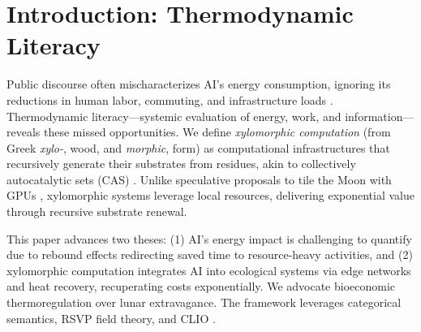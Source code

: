 \documentclass[11pt,a4paper]{article}
\theoremstyle{plain}
\theoremstyle{definition}
\theoremstyle{remark}
\begin{document}
\begin{abstract}
Across all four domains the same structural pattern obtains. A system boundary
is drawn too narrowly, a byproduct is classified as waste, and a relocation is
proposed to eliminate it. In thermodynamics, heat is externalized. In cognition,
prior formation is externalized. In epistemic systems, the evidence channel is
endogenized. In infrastructure, constraint environments are reconfigured. In each
case, the consequence is systematic misalignment between description and
operation, because the relevant structure has been placed outside the frame.

Policy mandates for Proof-of-Useful-Work-and-Heat (PoUWH) and Public Research
Objects (PROs) are derived as necessary conditions for membership in the
contractive regime, not merely as regulatory instruments. The paper concludes
that stable large-scale AI systems require dual closure: contraction of exogenous
entropy flows and preservation of exogenous information channels. Failure in
either domain produces attractors that are internally stable but externally
ungrounded.
\end{abstract}

\newpage
\tableofcontents
\newpage

\section{Introduction: Thermodynamic Literacy}

Public discourse often mischaracterizes AI's energy consumption, ignoring its
reductions in human labor, commuting, and infrastructure loads
\citep{strubell2019,koomey2011}. Thermodynamic literacy---systemic evaluation
of energy, work, and information---reveals these missed opportunities. We
define \emph{xylomorphic computation} (from Greek \emph{xylo-}, wood, and
\emph{morphic}, form) as computational infrastructures that recursively
generate their substrates from residues, akin to collectively autocatalytic
sets (CAS) \citep{kauffman1993}. Unlike speculative proposals to tile the Moon
with GPUs \citep{shams2025}, xylomorphic systems leverage local resources,
delivering exponential value through recursive substrate renewal.

This paper advances two theses: (1) AI's energy impact is challenging to
quantify due to rebound effects redirecting saved time to resource-heavy
activities, and (2) xylomorphic computation integrates AI into ecological
systems via edge networks and heat recovery, recuperating costs exponentially.
We advocate bioeconomic thermoregulation \citep{yuan2024,daly2011} over lunar
extravagance. The framework leverages categorical semantics, RSVP field theory,
and CLIO \citep{abramsky2004,shulman2012,cheng2025}.
\end{document}
